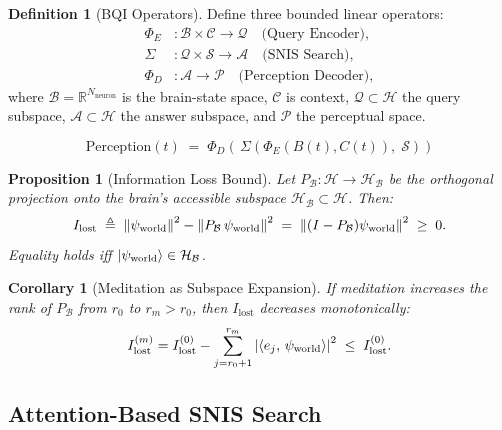 \documentclass[12pt,a4paper]{article}
\theoremstyle{plain}
\newtheorem{proposition}[theorem]{Proposition}
\newtheorem{corollary}[theorem]{Corollary}
\theoremstyle{definition}
\newtheorem{definition}[theorem]{Definition}
\theoremstyle{remark}
\newcommand{\vS}{\mathcal{S}}
\newcommand{\vH}{\mathcal{H}}
\newcommand{\vB}{\mathcal{B}}
\newcommand{\vQ}{\mathcal{Q}}
\newcommand{\vA}{\mathcal{A}}
\newcommand{\R}{\mathbb{R}}
\newcommand{\inner}[2]{\left\langle#1,\,#2\right\rangle}
\begin{document}
\begin{definition}[BQI Operators]
  Define three bounded linear operators:
  \begin{align}
    \Phi_E &: \vB \times \mathcal{C} \to \vQ  \quad \text{(Query Encoder)},\\
    \Sigma &: \vQ \times \vS \to \vA            \quad \text{(SNIS Search)},\\
    \Phi_D &: \vA \to \mathcal{P}               \quad \text{(Perception Decoder)},
  \end{align}
  where $\vB = \R^{N_\text{neuron}}$ is the brain-state space,
  $\mathcal{C}$ is context, $\vQ \subset \vH$ the query subspace,
  $\vA \subset \vH$ the answer subspace, and $\mathcal{P}$ the perceptual space.
\end{definition}

\begin{tcolorbox}[mathbox, title={Definition 3.3 — BQI Perception Equation}]
\begin{equation}
  \boxed{
    \mathrm{Perception}(t) \;=\; \Phi_D\!\left(\,\Sigma\!\left(\Phi_E(B(t), C(t)),\; \vS\right)\right)
  }
  \label{eq:bqi_main}
\end{equation}
\end{tcolorbox}

\begin{proposition}[Information Loss Bound]
Let $P_\vB : \vH \to \vH_\vB$ be the orthogonal projection onto the brain's accessible
subspace $\vH_\vB \subset \vH$. Then:
\begin{equation}
  I_{\text{lost}} \;\triangleq\; \norm{\psi_{\text{world}}}^2 - \norm{P_\vB\,\psi_{\text{world}}}^2
               \;=\; \norm{(I - P_\vB)\psi_{\text{world}}}^2 \;\geq\; 0.
  \label{eq:info_loss}
\end{equation}
Equality holds iff $\ket{\psi_{\text{world}}} \in \vH_\vB$.
\end{proposition}

\begin{corollary}[Meditation as Subspace Expansion]
If meditation increases the rank of $P_\vB$ from $r_0$ to $r_m > r_0$, then
$I_{\text{lost}}$ decreases monotonically:
\begin{equation}
  I_{\text{lost}}^{(m)} = I_{\text{lost}}^{(0)} - \sum_{j=r_0+1}^{r_m} \abs{\inner{e_j}{\psi_{\text{world}}}}^2
  \;\leq\; I_{\text{lost}}^{(0)}.
\end{equation}
\end{corollary}

\subsection{Attention-Based SNIS Search}
\label{subsec:attention}
\end{document}
